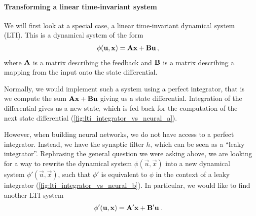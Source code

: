 \documentclass[10pt,letterpaper,oneside]{article}
\begin{document}
\paragraph{Transforming a linear time-invariant system}
We will first look at a special case, a linear time-invariant dynamical system (LTI). This is a dynamical system of the form
\begin{align*}
	\phi({\mathbf{u}}, {\mathbf{x}}) = {\mathbf{A}} {\mathbf{x}} + {\mathbf{B}} {\mathbf{u}} \,,
\end{align*}
where ${\mathbf{A}}$ is a matrix describing the feedback and ${\mathbf{B}}$ is a matrix describing a mapping from the input onto the state differential.

Normally, we would implement such a system using a perfect integrator, that is we compute the sum ${\mathbf{A}} {\mathbf{x}} + {\mathbf{B}} {\mathbf{u}}$ giving us a state differential. Integration of the differential gives us a new state, which is fed back for the computation of the next state differential (\cref{fig:lti_integrator_vs_neural_a}).

However, when building neural networks, we do not have access to a perfect integrator. Instead, we have the synaptic filter $h$, which can be seen as a \enquote{leaky integrator}. Rephrasing the general question we were asking above, we are looking for a way to rewrite the dynamical system $\phi(\vec u, \vec x)$ into a new dynamical system $\phi'(\vec u, \vec x)$, such that $\phi'$ is equivalent to $\phi$ in the context of a leaky integrator (\cref{fig:lti_integrator_vs_neural_b}). In particular, we would like to find another LTI system
\begin{align*}
	\phi'({\mathbf{u}}, {\mathbf{x}}) = {\mathbf{A}}' {\mathbf{x}} + {\mathbf{B}}' {\mathbf{u}} \,.
\end{align*}
\end{document}
